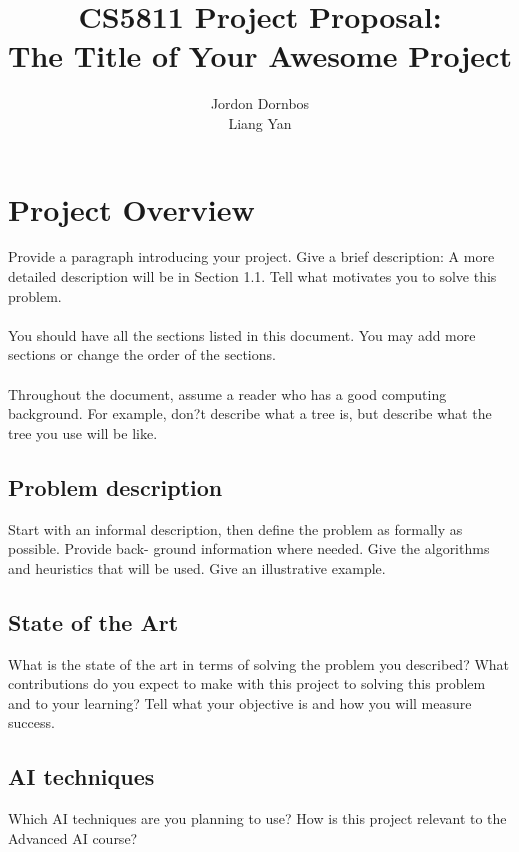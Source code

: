 \documentclass{article}
\begin{document}
\title{CS5811 Project Proposal: \\
The Title of Your Awesome Project}
\author{Jordon Dornbos \\
Liang Yan}
\maketitle

\section {Project Overview}
Provide a paragraph introducing your project. Give a brief description: A more detailed description will be in Section 1.1. Tell what motivates you to solve this problem. \\ \\
You should have all the sections listed in this document. You may add more sections or change the order of the sections. \\ \\
Throughout the document, assume a reader who has a good computing background. For example, don?t describe what a tree is, but describe what the tree you use will be like.

\subsection {Problem description}
Start with an informal description, then define the problem as formally as possible. Provide back- ground information where needed. Give the algorithms and heuristics that will be used. Give an illustrative example.

\subsection {State of the Art}
What is the state of the art in terms of solving the problem you described? What contributions do
you expect to make with this project to solving this problem and to your learning? Tell what your
objective is and how you will measure success.

\subsection {AI techniques}
Which AI techniques are you planning to use? How is this project relevant to the Advanced AI
course?
\end{document}
